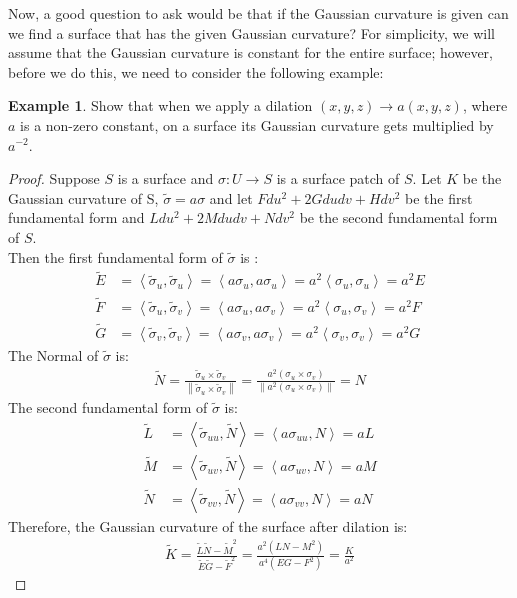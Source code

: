 \documentclass{article}
\theoremstyle{plain}
\theoremstyle{definition}
\newtheorem{example}{Example}
\theoremstyle{remark}
\begin{document}
Now, a good question to ask would be that if the Gaussian curvature is given can we find a surface that has the given Gaussian curvature? For simplicity, we will assume that the Gaussian curvature is constant for the entire surface; however, before we do this, we need to consider the following example:

\begin{example}
    Show that when we apply a dilation \( (x,y,z) \rightarrow a(x,y,z) \), where \(a\) is a non-zero constant, on a surface its Gaussian curvature gets multiplied by \(a^{-2}\).
\end{example}
\begin{proof}
    Suppose \( S \) is a surface and \(\sigma: U \rightarrow S \) is a surface patch of \(S\). Let \(K\) be the Gaussian curvature of S, \( \tilde{\sigma} = a\sigma \) and let \( Fdu^2 + 2Gdudv + Hdv^2 \) be the first fundamental form and \( Ldu^2 + 2Mdudv + Ndv^2 \) be the second fundamental form of \(S\). \\
    Then the first fundamental form of \( \tilde{\sigma}\) is :
    \begin{align*}
        \tilde{E} & = \left\langle \tilde{\sigma}_u, \tilde{\sigma}_u \right\rangle = \left\langle a\sigma_u, a\sigma_u \right\rangle = a^2 \left\langle \sigma_u, \sigma_u \right\rangle = a^2 E \\
        \tilde{F} & = \left\langle \tilde{\sigma}_u, \tilde{\sigma}_v \right\rangle = \left\langle a \sigma_u, a \sigma_v \right\rangle = a^2 \left\langle \sigma_u, \sigma_v \right\rangle = a^2 F \\
        \tilde{G} & = \left\langle \tilde{\sigma}_v, \tilde{\sigma}_v \right\rangle = \left\langle a\sigma_v, a\sigma_v \right\rangle = a^2 \left\langle \sigma_v, \sigma_v \right\rangle = a^2 G 
    \end{align*}
    The Normal of \( \tilde{\sigma}\) is: 
    \begin{align*}
        \tilde{N} = \frac{\tilde{\sigma}_u \times  \tilde{\sigma}_v}{\left\lVert \tilde{\sigma}_u \times  \tilde{\sigma}_v\right\rVert } = \frac{a^2 (\sigma_u \times \sigma_v) }{ \left\lVert a^2 (\sigma_u \times \sigma_v) \right\rVert } = N
    \end{align*}
    The second fundamental form of \( \tilde{\sigma}\) is:
        \begin{align*}
            \tilde{L} & = \left\langle \tilde{\sigma}_{uu}, \tilde{N} \right\rangle = \left\langle a \sigma_{uu}, N \right\rangle = aL \\
            \tilde{M} & = \left\langle \tilde{\sigma}_{uv}, \tilde{N} \right\rangle = \left\langle a \sigma_{uv}, N \right\rangle = aM \\
            \tilde{N} & = \left\langle \tilde{\sigma}_{vv}, \tilde{N} \right\rangle = \left\langle a \sigma_{vv}, N \right\rangle = aN 
        \end{align*}
        Therefore, the Gaussian curvature of the surface after dilation is:
        \begin{align*}
            \tilde{K} = \frac{\tilde{L}\tilde{N} - \tilde{M}^2}{\tilde{E}\tilde{G}-\tilde{F}^2} = \frac{a^2 (LN-M^2) }{ a^4( EG-F^2)} = \frac{K}{a^2}
        \end{align*}
\end{proof}
\end{document}
